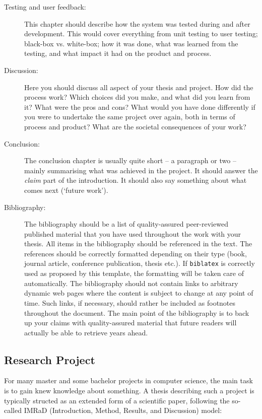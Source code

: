 \begin{description}
    \item[Testing and user feedback:] This chapter should describe how the system was tested during and after development. This would cover everything from unit testing to user testing; black-box vs. white-box; how it was done, what was learned from the testing, and what impact it had on the product and process.
    \item[Discussion:] Here you should discuss all aspect of your thesis and project. How did the process work? Which choices did you make, and what did you learn from it? What were the pros and cons? What would you have done differently if you were to undertake the same project over again, both in terms of process and product? What are the societal consequences of your work?
    \item[Conclusion:] The conclusion chapter is usually quite short – a paragraph or two – mainly summarising what was achieved in the project. It should answer the \emph{claim} part of the introduction. It should also say something about what comes next (`future work').
    \item[Bibliography:] The bibliography should be a list of quality-assured peer-reviewed published material that you have used throughout the work with your thesis. All items in the bibliography should be referenced in the text. The references should be correctly formatted depending on their type (book, journal article, conference publication, thesis etc.). If \texttt{biblatex} is correctly used as proposed by this template, the formatting will be taken care of automatically. The bibliography should not contain links to arbitrary dynamic web pages where the content is subject to change at any point of time. Such links, if necessary, should rather be included as footnotes throughout the document. The main point of the bibliography is to back up your claims with quality-assured material that future readers will actually be able to retrieve years ahead.
\end{description}

\subsection{Research Project}
\label{sec:resesarch}

For many master and some bachelor projects in computer science, the main task is to gain knew knowledge about something. A thesis describing such a project is typically structed as an extended form of a scientific paper, following the so-called IMRaD (Introduction, Method, Results, and Discussion) model:

